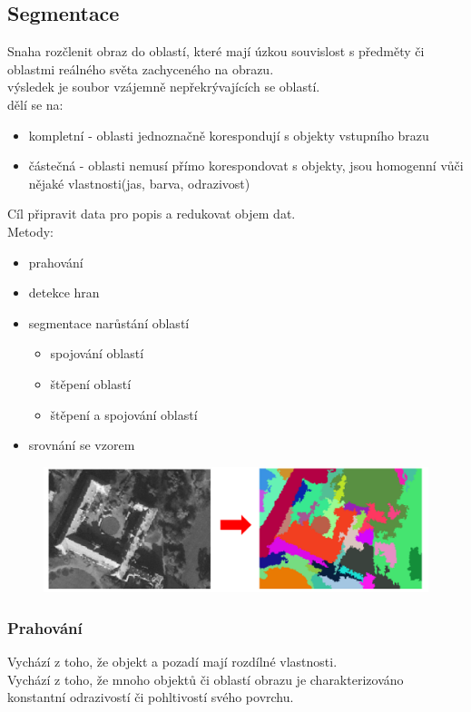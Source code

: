 \subsection{Segmentace}
Snaha rozčlenit obraz do oblastí, které mají úzkou souvislost s předměty či oblastmi reálného světa zachyceného na obrazu.\\
výsledek je soubor vzájemně nepřekrývajících se oblastí.\\
dělí se na:
\begin{itemize}
    \item kompletní - oblasti jednoznačně korespondují s objekty vstupního brazu
    \item částečná - oblasti nemusí přímo korespondovat s objekty, jsou homogenní vůči nějaké vlastnosti(jas, barva, odrazivost)
\end{itemize}
Cíl připravit data pro popis a redukovat objem dat.\\
Metody:
\begin{itemize}
    \item prahování
    \item detekce hran
    \item segmentace narůstání oblastí
          \begin{itemize}
              \item spojování oblastí
              \item štěpení oblastí
              \item štěpení a spojování oblastí
          \end{itemize}
    \item srovnání se vzorem
\end{itemize}
\begin{figure}[H]
    \includegraphics[scale = 0.3]{images/segmentace.png}
\end{figure}

\subsubsection{Prahování}
Vychází z toho, že objekt a pozadí mají rozdílné vlastnosti.\\
Vychází z toho, že mnoho objektů či oblastí obrazu je charakterizováno konstantní odrazivostí či pohltivostí svého povrchu.\\

